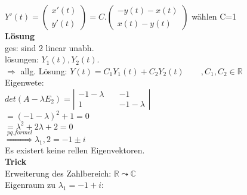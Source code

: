 								$Y' (t)=\begin{pmatrix}
									x'(t)\\
									y'(t)
								\end{pmatrix}=C . \begin{pmatrix}
								-y(t) - x(t)\\
								x(t)-y(t)
								\end{pmatrix}$
								wählen C=1\\ 
 \textbf{Lösung} \\
ges: sind 2 linear unabh. \\
lösungen: $Y_1(t), Y_2(t)$.	\\
$\Rightarrow $ allg. Lösung: $Y(t) = C_1 Y_1(t)+C_2 Y_2(t) \qquad, C_1,C_2\in \mathbb{R}$\\
Eigenwete:\\
$det(A-\lambda E_2)= \left| \begin{matrix}
	-1-  \lambda \quad &-1\\
	1			 \quad &-1-\lambda
\end{matrix}\right|$\\
$=(-1-\lambda)^2 +1 =0$\\
$=\lambda^2+2\lambda +2=0$\\
$\overset{pq.formel}{\Rightarrow} \lambda_1,2=-1\pm i$\\
Es existert keine rellen Eigenvektoren.\\
\textbf{Trick}\\
Erweiterung des Zahlbereich: $\mathbb{R} \leadsto \mathbb{C}$\\
Eigenraum zu $\lambda_1 = -1+i:$\\
